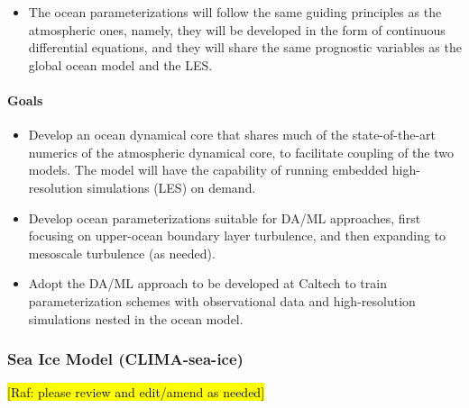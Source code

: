 \documentclass{article}
\begin{document}
\begin{itemize}
    \item The ocean parameterizations will follow the same guiding principles as the atmospheric ones, namely, they will be developed in the form of continuous differential equations, and they will share the same prognostic variables as the global ocean model and the LES.
\end{itemize}

\paragraph{Goals}
\begin{itemize}
    \item Develop an ocean dynamical core that shares much of the state-of-the-art numerics of the atmospheric dynamical core, to facilitate coupling of the two models. The model will have the capability of running embedded high-resolution simulations (LES) on demand.
    \item Develop ocean parameterizations suitable for DA/ML approaches, first focusing on upper-ocean boundary layer turbulence, and then expanding to mesoscale turbulence (as needed).
    \item Adopt the DA/ML approach to be developed at Caltech to train parameterization schemes with observational data and high-resolution simulations nested in the ocean model.
\end{itemize}

\subsubsection{Sea Ice Model (CLIMA-sea-ice)}

\hl{[Raf: please review and edit/amend as needed]}
\end{document}
